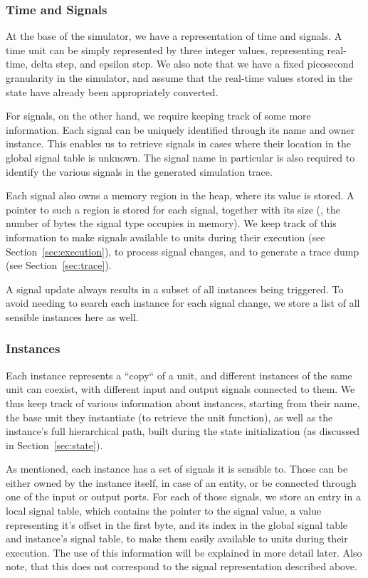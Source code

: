 
\subsubsection{Time and Signals}
At the base of the simulator, we have a representation of time and signals.
A time unit can be simply represented by three integer values, representing real-time, delta step, and epsilon step. We also note that we have a fixed picosecond granularity in the simulator, and assume that the real-time values stored in the state have already been appropriately converted.

For signals, on the other hand, we require keeping track of some more information. Each signal can be uniquely identified through its name and owner instance. This enables us to retrieve signals in cases where their location in the global signal table is unknown. The signal name in particular is also required to identify the various signals in the generated simulation trace.

Each signal also owns a memory region in the heap, where its value is stored. A pointer to such a region is stored for each signal, together with its size (\ie, the number of bytes the signal type occupies in memory). We keep track of this information to make signals available to units during their execution (see Section~\ref{sec:execution}), to process signal changes, and to generate a trace dump (see Section~\ref{sec:trace}).

A signal update always results in a subset of all instances being triggered. To avoid needing to search each instance for each signal change, we store a list of all sensible instances here as well.


\subsubsection{Instances}
Each instance represents a “copy“ of a unit, and different instances of the same unit can coexist, with different input and output signals connected to them. We thus keep track of various information about instances, starting from their name, the base unit they instantiate (to retrieve the unit function), as well as the instance's full hierarchical path, built during the state initialization (as discussed in Section~\ref{sec:state}).

As mentioned, each instance has a set of signals it is sensible to. Those can be either owned by the instance itself, in case of an entity, or be connected through one of the input or output ports. For each of those signals, we store an entry in a local signal table, which contains the pointer to the signal value, a value representing it's offset in the first byte, and its index in the global signal table and instance's signal table, to make them easily available to units during their execution. The use of this information will be explained in more detail later. Also note, that this does not correspond to the signal representation described above.

